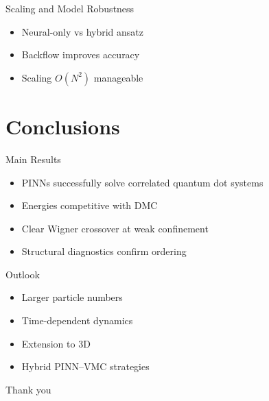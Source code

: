 \documentclass{beamer}
\begin{document}
\begin{frame}{Scaling and Model Robustness}
\begin{itemize}
\item Neural-only vs hybrid ansatz
\item Backflow improves accuracy
\item Scaling $O(N^2)$ manageable
\end{itemize}
\end{frame}

\section{Conclusions}

\begin{frame}{Main Results}
\begin{itemize}
\item PINNs successfully solve correlated quantum dot systems
\item Energies competitive with DMC
\item Clear Wigner crossover at weak confinement
\item Structural diagnostics confirm ordering
\end{itemize}
\end{frame}

\begin{frame}{Outlook}
\begin{itemize}
\item Larger particle numbers
\item Time-dependent dynamics
\item Extension to 3D
\item Hybrid PINN–VMC strategies
\end{itemize}
\end{frame}

\begin{frame}
\centering
\Huge Thank you
\end{frame}
\end{document}
